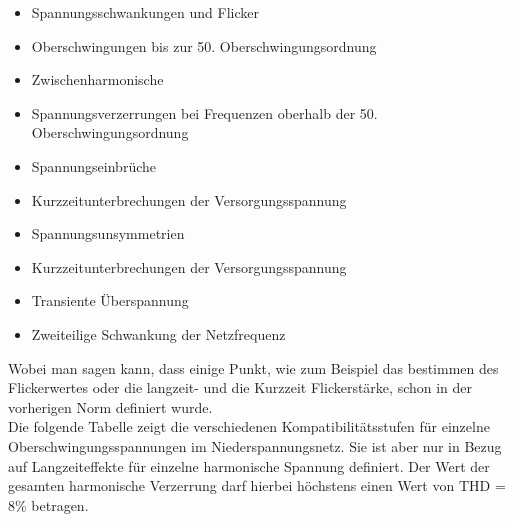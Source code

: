 \begin{itemize}
	\item Spannungsschwankungen und Flicker 
	\item Oberschwingungen bis zur 50. Oberschwingungsordnung
	\item Zwischenharmonische
	\item Spannungsverzerrungen bei Frequenzen oberhalb der 50. Oberschwingungsordnung
	\item Spannungseinbrüche
	\item Kurzzeitunterbrechungen der Versorgungsspannung
	\item Spannungsunsymmetrien
	\item Kurzzeitunterbrechungen der Versorgungsspannung
	\item Transiente Überspannung
	\item Zweiteilige Schwankung der Netzfrequenz
\end{itemize}
Wobei man sagen kann, dass einige Punkt, wie zum Beispiel das bestimmen des Flickerwertes oder die langzeit- und die Kurzzeit Flickerstärke, schon in der vorherigen Norm definiert wurde.\\
Die folgende Tabelle zeigt die verschiedenen Kompatibilitätsstufen für einzelne Oberschwingungsspannungen im Niederspannungsnetz. Sie ist aber nur in Bezug auf Langzeiteffekte für einzelne harmonische Spannung definiert. Der Wert der gesamten harmonische Verzerrung darf hierbei höchstens einen Wert von THD = 8\% betragen.
